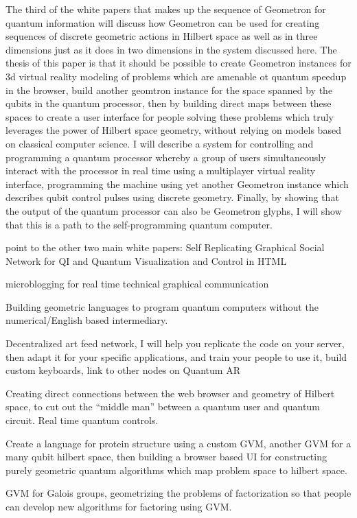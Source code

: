 \documentclass[11pt]{article}
\begin{document}
The third of the white papers that makes up the sequence of Geometron for quantum information will discuss how Geometron can be used for creating sequences of discrete geometric actions in Hilbert space as well as in three dimensions just as it does in two dimensions in the system discussed here.  The thesis of this paper is that it should be possible to create Geometron instances for 3d virtual reality modeling of problems which are amenable ot quantum speedup in the browser, build another geomtron instance for the space spanned by the qubits in the quantum processor, then by building direct maps between these spaces to create a user interface for people solving these problems which truly leverages the power of Hilbert space geometry, without relying on models based on classical computer science.   I will describe a system for controlling and programming a quantum processor whereby a group of users simultaneously interact with the processor in real time using a multiplayer virtual reality interface, programming the machine using yet another Geometron instance which describes qubit control pulses using discrete geometry.  Finally, by showing that the output of the quantum processor can also be Geometron glyphs, I will show that this is a path to the self-programming quantum computer.



point to the other two main white papers: 
    Self Replicating Graphical Social Network for QI and 
    Quantum Visualization and Control in HTML

    microblogging for real time technical graphical communication




    Building geometric languages to program quantum computers without the numerical/English based intermediary.




    Decentralized art feed network, I will help you replicate the code on your server, then adapt it for your specific applications, and train your people to use it, build custom keyboards, link to other nodes on Quantum AR





Creating direct connections between the web browser and geometry of Hilbert space, to cut out the ``middle man'' between a quantum user and quantum circuit.  Real time quantum controls.    


    Create a language for protein structure using a custom GVM, another GVM for a many qubit hilbert space, then building a browser based UI for constructing purely geometric quantum algorithms which map problem space to hilbert space.  


    GVM for Galois groups, geometrizing the problems of factorization so that people can develop new algorithms for factoring using GVM.
\end{document}
